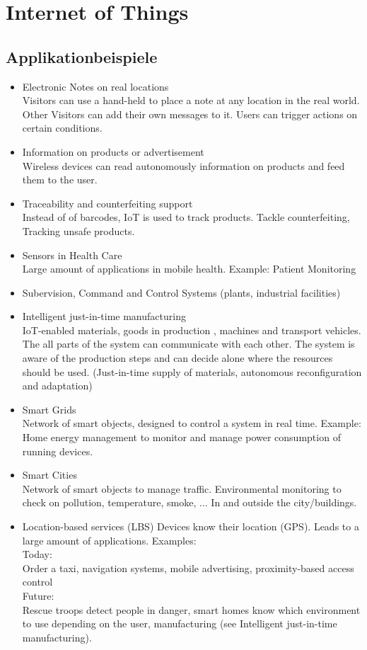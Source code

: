 \documentclass[a4paper, 12pt]{article}
\begin{document}
\section{Internet of Things}
\subsection{Applikationbeispiele}
\begin{itemize}
	\item Electronic Notes on real locations \\
	Visitors can use a hand-held to place a note at any location in the real world.
	Other Visitors can add their own messages to it.
	Users can trigger actions on certain conditions.
	\item Information on products or advertisement \\
	Wireless devices can read autonomously information on products and feed them to the user.
	\item Traceability and counterfeiting support \\
	Instead of of barcodes, IoT is used to track products.
	Tackle counterfeiting, Tracking unsafe products.
	\item Sensors in Health Care \\
	Large amount of applications in mobile health. Example: Patient Monitoring
	\item Subervision, Command and Control Systems (plants, industrial facilities)
	\item Intelligent just-in-time manufacturing \\
	IoT-enabled materials, goods in production , machines and transport vehicles.
	The all parts of the system can communicate with each other.
	The system is aware of the production steps and can decide alone where the resources should be used. (Just-in-time supply of materials, autonomous reconfiguration and adaptation)
	\item Smart Grids \\
	Network of smart objects, designed to control a system in real time. Example: Home energy management to monitor and manage power consumption of running devices.
	\item Smart Cities \\
	Network of smart objects to manage traffic.
	Environmental monitoring to check on pollution, temperature, smoke, ...
	In and outside the city/buildings.
	\item Location-based services (LBS)
	Devices know their location (GPS). Leads to a large amount of applications.
	Examples:\\
	Today: \\
	Order a taxi, navigation systems, mobile advertising, proximity-based access control\\
	Future: \\
	Rescue troops detect people in danger, smart homes know which environment to use depending on the user, manufacturing (see Intelligent just-in-time manufacturing).
\end{itemize}
\end{document}
